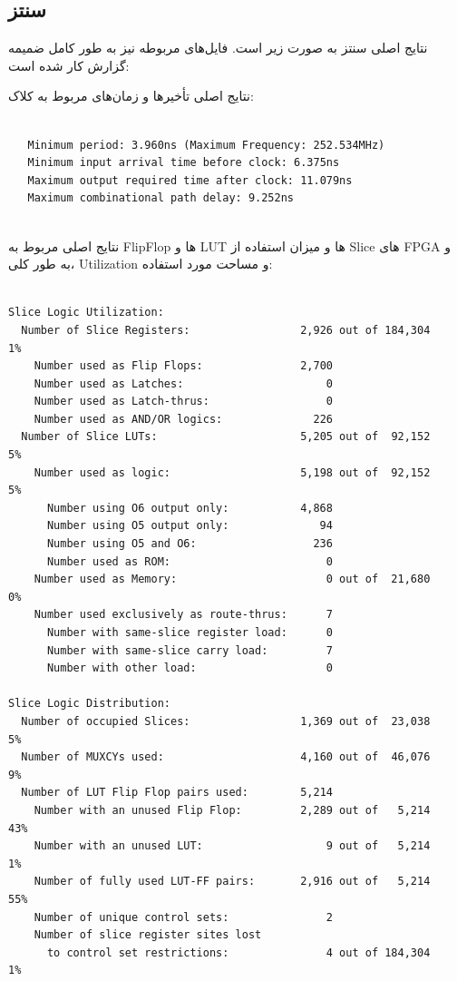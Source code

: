 \documentclass[12pt,titlepage,a4page , tikz , multi,table , svgnames,xcdraw]{article}
\begin{document}
\subsection{سنتز }

نتایج اصلی سنتز به صورت زیر است. فایل‌های مربوطه نیز به طور کامل ضمیمه گزارش کار شده است:

نتایج اصلی تأخیرها و زمان‌های مربوط به کلاک:

\begin{latin}
\begin{verbatim}

   Minimum period: 3.960ns (Maximum Frequency: 252.534MHz)
   Minimum input arrival time before clock: 6.375ns
   Maximum output required time after clock: 11.079ns
   Maximum combinational path delay: 9.252ns


\end{verbatim}
\end{latin}


نتایج اصلی مربوط به FlipFlop ها و LUT ها و میزان استفاده از Slice های FPGA و به طور کلی، Utilization و مساحت مورد استفاده:

\begin{latin}
\begin{verbatim}

Slice Logic Utilization:
  Number of Slice Registers:                 2,926 out of 184,304    1%
    Number used as Flip Flops:               2,700
    Number used as Latches:                      0
    Number used as Latch-thrus:                  0
    Number used as AND/OR logics:              226
  Number of Slice LUTs:                      5,205 out of  92,152    5%
    Number used as logic:                    5,198 out of  92,152    5%
      Number using O6 output only:           4,868
      Number using O5 output only:              94
      Number using O5 and O6:                  236
      Number used as ROM:                        0
    Number used as Memory:                       0 out of  21,680    0%
    Number used exclusively as route-thrus:      7
      Number with same-slice register load:      0
      Number with same-slice carry load:         7
      Number with other load:                    0

Slice Logic Distribution:
  Number of occupied Slices:                 1,369 out of  23,038    5%
  Number of MUXCYs used:                     4,160 out of  46,076    9%
  Number of LUT Flip Flop pairs used:        5,214
    Number with an unused Flip Flop:         2,289 out of   5,214   43%
    Number with an unused LUT:                   9 out of   5,214    1%
    Number of fully used LUT-FF pairs:       2,916 out of   5,214   55%
    Number of unique control sets:               2
    Number of slice register sites lost
      to control set restrictions:               4 out of 184,304    1%

\end{verbatim}
\end{latin}
\end{document}
